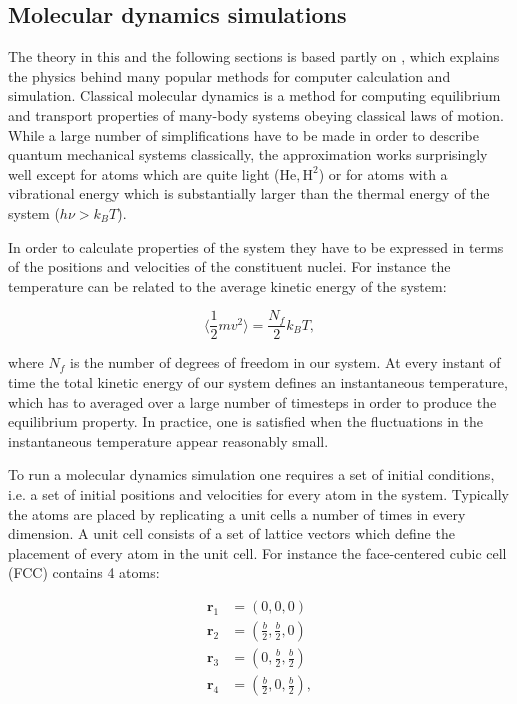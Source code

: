 \subsection{Molecular dynamics simulations}
The theory in this and the following sections
is based partly on \parencite[Frenkel, Daan
and Smit, Berend][pages 63-107]{frenkel2001understanding},
which explains the physics behind many popular methods 
for computer calculation and simulation.
Classical molecular dynamics is a method
for computing equilibrium and transport properties
of many-body systems obeying classical laws of motion.
While a large number of simplifications have to be made
in order to describe quantum mechanical systems classically,
the approximation works surprisingly well
except for atoms which are quite light ($\text{He}, \text{H}^2$)
or for atoms with a vibrational energy
which is substantially larger than the thermal energy
of the system ($h\nu > k_B T$).
\par
In order to calculate properties of the system
they have to be expressed in terms of the positions
and velocities of the constituent nuclei.
For instance the temperature can be related
to the average kinetic energy of the system:

\begin{equation}
 \langle \frac{1}{2} m v^2 \rangle = \frac{N_f}{2} k_B T , 
\end{equation}

where $N_f$ is the number of degrees of freedom in our system.
At every instant of time the total kinetic energy
of our system defines an instantaneous temperature,
which has to averaged over a large number of timesteps
in order to produce the equilibrium property.
In practice, one is satisfied when the fluctuations
in the instantaneous temperature appear reasonably small.
\par
To run a molecular dynamics simulation one requires
a set of initial conditions, i.e. a set of initial positions and velocities
for every atom in the system. Typically the atoms
are placed by replicating a unit cells a number of times
in every dimension. A unit cell consists of a set
of lattice vectors which define the placement of every atom in the
unit cell. For instance the face-centered cubic cell (FCC)
contains 4 atoms:

\begin{equation}
    \begin{split}
        \bm{r}_1 &= (0, 0, 0) \\
        \bm{r}_2 &= (\frac{b}{2}, \frac{b}{2}, 0) \\
        \bm{r}_3 &= (0, \frac{b}{2}, \frac{b}{2}) \\
        \bm{r}_4 &= (\frac{b}{2}, 0, \frac{b}{2}) , \\
    \end{split}
\end{equation}

